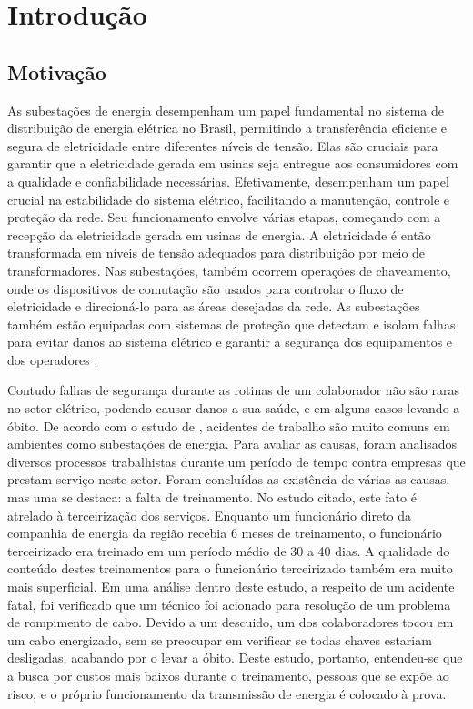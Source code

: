 \chapter{Introdução}

\section{Motivação}
\label{sec:motivation}

As subestações de energia desempenham um papel fundamental no sistema de distribuição de energia elétrica no Brasil, permitindo a transferência eficiente e segura de eletricidade entre diferentes níveis de tensão. Elas são cruciais para garantir que a eletricidade gerada em usinas seja entregue aos consumidores com a qualidade e confiabilidade necessárias. Efetivamente, desempenham um papel crucial na estabilidade do sistema elétrico, facilitando a manutenção, controle e proteção da rede. Seu funcionamento envolve várias etapas, começando com a recepção da eletricidade gerada em usinas de energia. A eletricidade é então transformada em níveis de tensão adequados para distribuição por meio de transformadores. Nas subestações, também ocorrem operações de chaveamento, onde os dispositivos de comutação são usados para controlar o fluxo de eletricidade e direcioná-lo para as áreas desejadas da rede. As subestações também estão equipadas com sistemas de proteção que detectam e isolam falhas para evitar danos ao sistema elétrico e garantir a segurança dos equipamentos e dos operadores \cite {randolph2013electric}.

Contudo falhas de segurança durante as rotinas de um colaborador não são raras no setor elétrico, podendo causar danos a sua saúde, e em alguns casos levando a óbito. De acordo com o estudo de \cite{lima2021precarizaccao}, acidentes de trabalho são muito comuns em ambientes como subestações de energia. Para avaliar as causas, foram analisados diversos processos trabalhistas durante um período de tempo contra empresas que prestam serviço neste setor. Foram concluídas as existência de várias as causas, mas uma se destaca: a falta de treinamento. No estudo citado, este fato é atrelado à terceirização dos serviços. Enquanto um funcionário direto da companhia de energia da região recebia 6 meses de treinamento, o funcionário terceirizado era treinado em um período médio de 30 a 40 dias. A qualidade do conteúdo destes treinamentos para o funcionário terceirizado também era muito mais superficial. Em uma análise dentro deste estudo, a respeito de um acidente fatal, foi verificado que um técnico foi acionado para resolução de um problema de rompimento de cabo. Devido a um descuido, um dos colaboradores tocou em um cabo energizado, sem se preocupar em verificar se todas chaves estariam desligadas, acabando por o levar a óbito. Deste estudo, portanto, entendeu-se que a busca por custos mais baixos durante o treinamento, pessoas que se expõe ao risco, e o próprio funcionamento da transmissão de energia é colocado à prova. 


